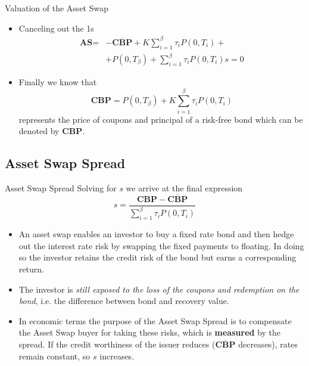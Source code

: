 \documentclass{beamer}
\begin{document}
\begin{frame}{Valuation of the Asset Swap}
	\begin{itemize}
		\item Canceling out the 1s
		\begin{equation*}
			\begin{aligned}
				\textbf{AS}=&-\overline{\textbf{CBP}}+K\sum_{i=1}^\beta\tau_i P(0,T_i) + \\
				& + P(0,T_\beta) + \sum_{i=1}^{\beta}\tau_i P(0,T_i)s=0
			\end{aligned}
		\end{equation*}
		\item Finally we know that
		\begin{equation*}
			\textbf{CBP} = P(0,T_\beta) + K\sum_{i=1}^\beta\tau_i P(0,T_i)
		\end{equation*}
		represents the price of coupons and principal of a  risk-free bond which can be denoted by \textbf{CBP}.
	\end{itemize}
\end{frame}

\subsection{Asset Swap Spread}
\begin{frame}{Asset Swap Spread}
	Solving for $s$ we arrive at the final expression
	\begin{equation}
		\boxed{s = \frac{\textbf{CBP}-\overline{\textbf{CBP}}}{\sum_{i=1}^{\beta}\tau_iP(0,T_i)}}
	\end{equation}
\myendproof
	\begin{itemize}
	\item<2-> An asset swap enables an investor to buy a fixed rate bond and then hedge out the interest rate risk by swapping the fixed payments to floating. In doing so the investor retains the credit risk of the bond but earns a corresponding return. 
	\item<3-> The investor is \emph{still exposed to the loss of the coupons and redemption on the bond}, i.e. the difference between bond and recovery value.
	\item<4-> In economic terms the purpose of the Asset Swap Spread is to compensate the Asset Swap buyer for taking these risks, which is \textbf{measured} by the spread. If the credit worthiness of the issuer reduces ($\overline{\textbf{CBP}}$ decreases), rates remain constant, so $s$ increases.
	\end{itemize}
\end{frame}
\end{document}
